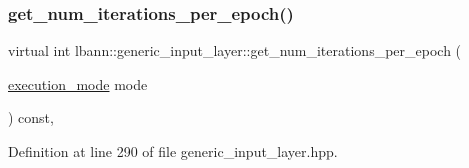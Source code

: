 \subsubsection{\texorpdfstring{get\+\_\+num\+\_\+iterations\+\_\+per\+\_\+epoch()}{get\_num\_iterations\_per\_epoch()}\hspace{0.1cm}{\footnotesize\ttfamily [1/2]}}
{\footnotesize\ttfamily virtual int lbann\+::generic\+\_\+input\+\_\+layer\+::get\+\_\+num\+\_\+iterations\+\_\+per\+\_\+epoch (\begin{DoxyParamCaption}\item[{\hyperlink{base_8hpp_a2781a159088df64ed7d47cc91c4dc0a8}{execution\+\_\+mode}}]{mode }\end{DoxyParamCaption}) const\hspace{0.3cm}{\ttfamily [inline]}, {\ttfamily [virtual]}}



Definition at line 290 of file generic\+\_\+input\+\_\+layer.\+hpp.


